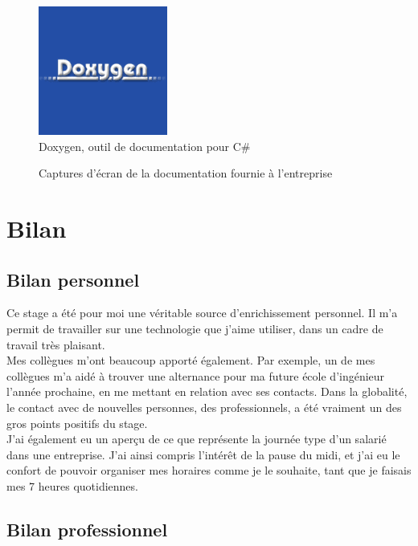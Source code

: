 \documentclass[a4paper]{article}
\begin{document}
    \begin{figure}[H]
        \centering
        \includegraphics{img/logo-doxygen}
        \caption{Doxygen, outil de documentation pour C\#}
    \end{figure}

    \begin{figure}[H]
        \caption{Captures d'écran de la documentation fournie à l'entreprise}
    \end{figure}

    \section{Bilan}
    
    \subsection{Bilan personnel}

        Ce stage a été pour moi une véritable source d'enrichissement personnel. Il m'a permit de travailler sur une technologie que j'aime utiliser, dans un cadre de travail très plaisant. \\

        Mes collègues m'ont beaucoup apporté également. Par exemple, un de mes collègues m'a aidé à trouver une alternance pour ma future école d'ingénieur l'année prochaine, en me mettant en relation avec ses contacts. Dans la globalité, le contact avec de nouvelles personnes, des professionnels, a été vraiment un des gros points positifs du stage. \\

        J'ai également eu un aperçu de ce que représente la journée type d'un salarié dans une entreprise. J'ai ainsi compris l'intérêt de la pause du midi, et j'ai eu le confort de pouvoir organiser mes horaires comme je le souhaite, tant que je faisais mes 7 heures quotidiennes. \\

    \subsection{Bilan professionnel}
\end{document}
